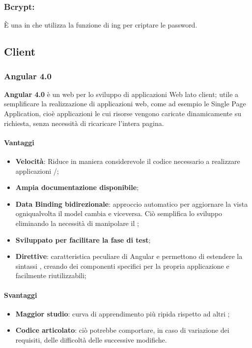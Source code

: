 	\subsubsection{Bcrypt:} È una  in  che utilizza la funzione di ing per criptare le password.

\subsection{Client}

	\subsubsection{Angular 4.0}
	\textbf{Angular 4.0} è un  web  per lo sviluppo di applicazioni Web lato client; utile a semplificare la realizzazione di applicazioni web, come ad esempio le Single Page Application, cioè applicazioni le cui risorse vengono caricate dinamicamente su richiesta, senza necessità di ricaricare l’intera pagina.

\paragraph{Vantaggi}
\begin{itemize}
\item \textbf{Velocità}: Riduce in maniera considerevole il codice necessario a realizzare applicazioni /;
\item \textbf{Ampia documentazione disponibile};
\item \textbf{Data Binding bidirezionale}: approccio automatico per aggiornare la vista ogniqualvolta il model cambia e viceversa. Ciò semplifica lo sviluppo eliminando la necessità di manipolare il ;
\item \textbf{Sviluppato per facilitare la fase di test};
\item \textbf{Direttive}: caratteristica peculiare di Angular e permettono di estendere la sintassi  , creando dei componenti specifici per la propria applicazione e facilmente riutilizzabili;
\end{itemize}

\paragraph{Svantaggi}
\begin{itemize}
\item \textbf{Maggior studio}: curva di apprendimento più ripida rispetto ad altri ;
\item \textbf{Codice articolato}: ciò potrebbe comportare, in caso di variazione dei requisiti, delle difficoltà delle successive modifiche.
\end{itemize}

